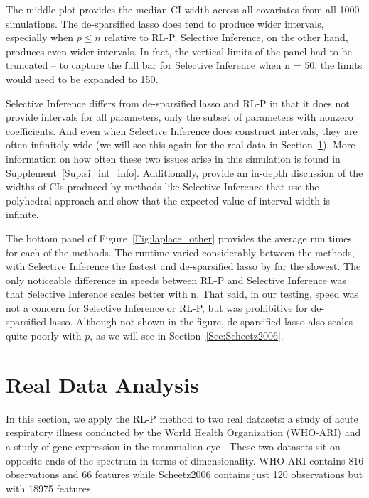 The middle plot provides the median CI width across all covariates from all 1000 simulations. The de-sparsified lasso does tend to produce wider intervals, especially when $p \le n$ relative to RL-P. Selective Inference, on the other hand, produces even wider intervals. In fact, the vertical limits of the panel had to be truncated -- to capture the full bar for Selective Inference when n = 50, the limits would need to be expanded to 150.

Selective Inference differs from de-sparsified lasso and RL-P in that it does not provide intervals for all parameters, only the subset of parameters with nonzero coefficients. And even when Selective Inference does construct intervals, they are often infinitely wide (we will see this again for the real data in Section~\ref{Sec:RDA}). More information on how often these two issues arise in this simulation is found in Supplement~\ref{Sup:si_int_info}. Additionally, \cite{Kivaranovic2021} provide an in-depth discussion of the widths of CIs produced by methods like Selective Inference that use the polyhedral approach and show that the expected value of interval width is infinite.

The bottom panel of Figure~\ref{Fig:laplace_other} provides the average run times for each of the methods. The runtime varied considerably between the methods, with Selective Inference the fastest and de-sparsified lasso by far the slowest.  The only noticeable difference in speeds between RL-P and Selective Inference was that Selective Inference scales better with n. That said, in our testing, speed was not a concern for Selective Inference or RL-P, but was prohibitive for de-sparsified lasso. Although not shown in the figure, de-sparsified lasso also scales quite poorly with $p$, as we will see in Section~\ref{Sec:Scheetz2006}.

\section{Real Data Analysis}\label{Sec:RDA}

In this section, we apply the RL-P method to two real datasets: a study of acute respiratory illness conducted by the World Health Organization (WHO-ARI) and a study of gene expression in the mammalian eye \citep{Scheetz2006}. These two datasets sit on opposite ends of the spectrum in terms of dimensionality. WHO-ARI contains 816 observations and 66 features while Scheetz2006 contains just 120 observations but with 18975 features.

